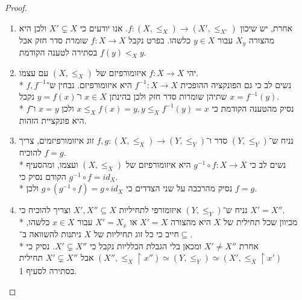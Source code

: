 \begin{proof}
	\begin{enumerate}
		\item אחרת, יש שיכון $f : (X, \le_X) \to (X', \le_{X'})$. אנו יודעים כי $X' \subsetneq X$ ולכן היא מהצורה $X_y$ עבור $y \in X$ כלשהו.
			בפרט נקבל $f : X \to X$ שומרת סדר חזק אבל $f(y) <_X y$ בסתירה לטענה הקודמת.
		\item יהי $f : X \to X$ איזומורפיזם של $(X, \le_X)$ עם עצמו. \\*
			נשים לב כי גם הפונקציה ההופכית $f^{-1} : X \to X$ היא איזומורפיזם.
			נבחין ש־$f, f^{-1}$ שתיהן שומרות סדר חזק ולכן בהינתן $x \in X$ ו־$y = f(x)$ נקבל $x = f^{-1}(y)$. \\*
			נסיק מהטענה הקודמת כי $x \le_X f(x) = y, y \le_X f^{-1}(y) = x$ ולכן $x = y$ ו־$f$ היא פונקציית הזהות.
		\item נניח ש־$(Y, \le_Y)$ סדר ו־$f, g : (X, \le_X) \to (Y, \le_Y)$ זוג איזומורפיזמים, צריך להוכיח $f = g$. \\*
			נשים לב כי $g^{-1} \circ f : X \to X$ היא איזומורפיזם של $(X, \le_X)$ ועצמו, ומהסעיף הקודם נסיק כי $g^{-1} \circ f = id_X$.\\*
			נסיק מהרכבה על שני הצדדים כי $g \circ (g^{-1} \circ f) = g \circ id_X$ ולכן $f = g$.
		\item נניח ש־$(Y, \le_Y)$ איזומורפי לתחיליות $X', X'' \subseteq X$ וצריך להוכיח כי $X' = X''$. \\*
			מכיוון שכל תחילית של $X$ היא מהצורה $X' = X$ או $X' = X_x$ עבור $x \in X$ כלשהו, חייב כי כל זוג תחיליות של $X$ ניתנות להשוואה ב־$\subseteq$. \\*
			אחרת $X' \ne X''$ ומכאן בלי הגבלת הכלליות נקבל כי $X' \subsetneq X''$.
			נסיק כי $(X'', \le_X \upharpoonright x'') \simeq (Y, \le_Y) \simeq (X', \le_X \upharpoonright x')$ אבל $X' \subsetneq X''$ תחילית בסתירה לסעיף 1.
	\end{enumerate}
\end{proof}
